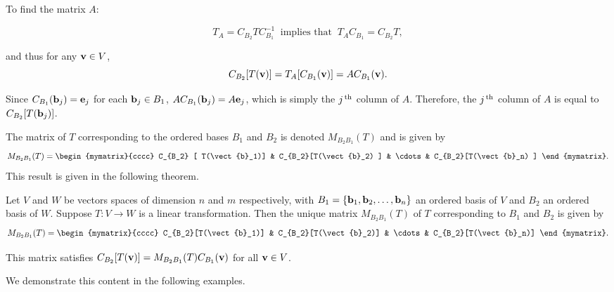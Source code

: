 To find the matrix $A$:

\begin{equation*}
  T_A=C_{B_2}TC_{B_1}^{-1}~\mbox{ implies that }~
  T_AC_{B_1}=C_{B_2}T,
\end{equation*}

and thus for any $\mbox{\bf v}\in V$,
\begin{equation*}
  C_{B_2}[T(\mbox{\bf v})] = T_A[C_{B_1}(\mbox{\bf v})]
  =AC_{B_1}(\mbox{\bf v}).
\end{equation*}

Since $C_{B_1}(\mbox{\bf b}_j)=\mbox{\bf e}_j$ for each $\mbox{\bf b}_j\in B_1$,
$AC_{B_1}(\mbox{\bf b}_j)=A\mbox{\bf e}_j$, which is simply the $j^{\,\rm th}$ column
of $A$.  Therefore, the $j^{\,\rm th}$ column of $A$ is equal to
$C_{B_2}[T(\mbox{\bf b}_j)]$.

The matrix of $T$ corresponding to the ordered bases $B_1$ and $B_2$
is denoted $ M_{B_2B_1}(T)$ and is given by
\begin{equation*}
  M_{B_2B_1}(T)=
  \begin{mymatrix}{cccc}
    C_{B_2} [ T(\vect{b}_1)] & C_{B_2}[T(\vect{b}_2) ] &
    \cdots & C_{B_2}[T(\vect{b}_n) ] \end{mymatrix}.
\end{equation*}
This result is given in the following theorem.

\begin{theorem}{}{}
  Let $V$ and $W$ be vectors spaces of dimension $n$ and $m$
  respectively, with
  $B_1=\left\{\mbox{\bf b}_1, \mbox{\bf b}_2, \ldots, \mbox{\bf b}_n\right\}$ an ordered
  basis of $V$ and $B_2$ an ordered basis of $W$. Suppose $T:V\to W$
  is a linear transformation. Then the unique matrix $M_{B_2B_1}(T)$
  of $T$ corresponding to $B_1$ and $B_2$ is given by
  \begin{equation*}
    M_{B_2B_1}(T)=
    \begin{mymatrix}{cccc}
      C_{B_2}[T(\vect{b}_1)] & C_{B_2}[T(\vect{b}_2)] &
      \cdots & C_{B_2}[T(\vect{b}_n)] \end{mymatrix}.
  \end{equation*}

  This matrix satisfies
  $C_{B_2}[T(\mbox{\bf v})]=M_{B_2B_1}(T)C_{B_1}(\mbox{\bf v})$ for all
  $\mbox{\bf v}\in V$.
\end{theorem}

We demonstrate this content in the following examples.

